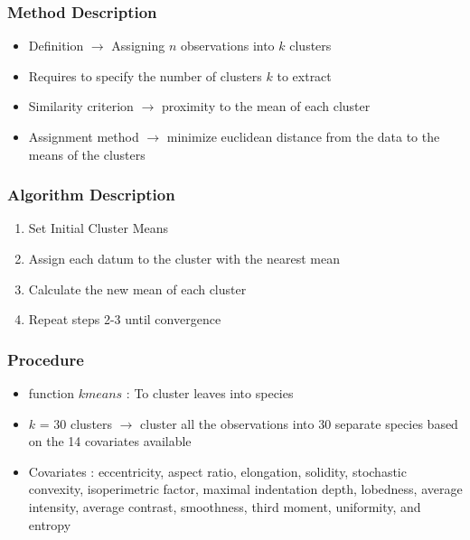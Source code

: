 \documentclass{beamer}
\begin{document}
\begin{frame}
\frametitle{Method Description} 
\begin{itemize}
\item Definition $\rightarrow$ Assigning $n$ observations into $k$ clusters
\item Requires to specify the number of clusters $k$ to extract
\item Similarity criterion $\rightarrow$ proximity  to	the	mean of each cluster
\item Assignment method $\rightarrow$ minimize	euclidean distance from the data to the means of the clusters
\end{itemize}
\end{frame}





\begin{frame}
\frametitle{Algorithm Description}
\begin{center}
\begin{enumerate}
\item Set Initial Cluster Means
\item Assign each datum to	the	cluster	with	
the	nearest	mean
\item Calculate	the	new	mean of each cluster
\item Repeat steps 2-3 until convergence	

\end{enumerate}
\end{center}
\end{frame}






\begin{frame}
\frametitle{Procedure}
\begin{itemize}
\item function $kmeans$ : To cluster leaves into species
\item $k$ = 30 clusters $\rightarrow$ cluster all the observations into 30 separate species based on the 14 covariates available
\item Covariates : eccentricity, aspect ratio, elongation, solidity, stochastic convexity, isoperimetric factor, maximal indentation depth, lobedness, average intensity, average contrast, smoothness, third moment, uniformity, and entropy

\end{itemize}
\end{frame}
\end{document}
